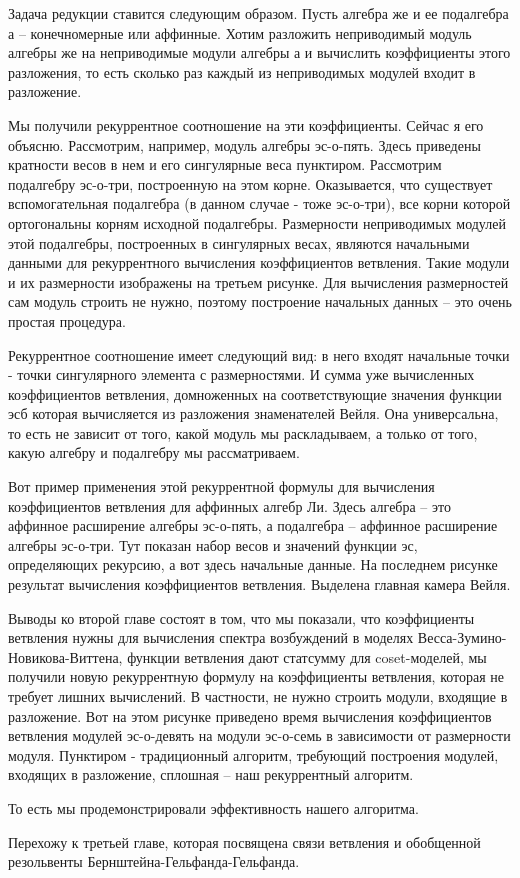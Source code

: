 \documentclass{article}
\theoremstyle{definition} \newtheorem{Def}{Определение}
\begin{document}
Задача редукции ставится следующим образом. Пусть алгебра же и ее подалгебра а -- конечномерные или аффинные. Хотим разложить неприводимый модуль алгебры же на неприводимые модули алгебры а и вычислить коэффициенты этого разложения, то есть сколько раз каждый из неприводимых модулей входит в разложение. 

Мы получили рекуррентное соотношение на эти коэффициенты. Сейчас я его объясню. 
Рассмотрим, например, модуль алгебры эс-о-пять. Здесь приведены кратности весов в нем и его сингулярные веса пунктиром. Рассмотрим подалгебру эс-о-три, построенную на этом корне. Оказывается, что существует вспомогательная подалгебра (в данном случае - тоже эс-о-три), все корни которой ортогональны корням исходной подалгебры. Размерности неприводимых модулей этой подалгебры, построенных в сингулярных весах, являются начальными данными для рекуррентного вычисления коэффициентов ветвления. Такие модули и их размерности изображены на третьем рисунке. Для вычисления размерностей сам модуль строить не нужно, поэтому построение начальных данных -- это очень простая процедура. 

Рекуррентное соотношение имеет следующий вид: в него входят начальные точки - точки сингулярного элемента с размерностями. И сумма уже вычисленных коэффициентов ветвления, домноженных на соответствующие значения функции эсб которая вычисляется из разложения знаменателей Вейля. Она универсальна, то есть не зависит от того, какой модуль мы раскладываем, а только от того, какую алгебру и подалгебру мы рассматриваем. 

Вот пример применения этой рекуррентной формулы для вычисления коэффициентов ветвления для аффинных алгебр Ли. Здесь алгебра -- это аффинное расширение алгебры эс-о-пять, а подалгебра -- аффинное расширение алгебры эс-о-три. Тут показан набор весов и значений функции эс, определяющих рекурсию, а вот здесь начальные данные. На последнем рисунке результат вычисления коэффициентов ветвления. Выделена главная камера Вейля. 

Выводы ко второй главе состоят в том, что мы показали, что коэффициенты ветвления нужны для вычисления спектра возбуждений в моделях Весса-Зумино-Новикова-Виттена, функции ветвления дают статсумму для coset-моделей, мы получили новую рекуррентную формулу на коэффициенты ветвления, которая не требует лишних вычислений. В частности, не нужно строить модули, входящие в разложение. Вот на этом рисунке приведено время вычисления коэффициентов ветвления модулей эс-о-девять на модули эс-о-семь в зависимости от размерности модуля. Пунктиром - традиционный алгоритм, требующий построения модулей, входящих в разложение, сплошная -- наш рекуррентный алгоритм. 

То есть мы продемонстрировали эффективность нашего алгоритма.

Перехожу к третьей главе, которая посвящена связи ветвления и обобщенной резольвенты Бернштейна-Гельфанда-Гельфанда. 
\end{document}
